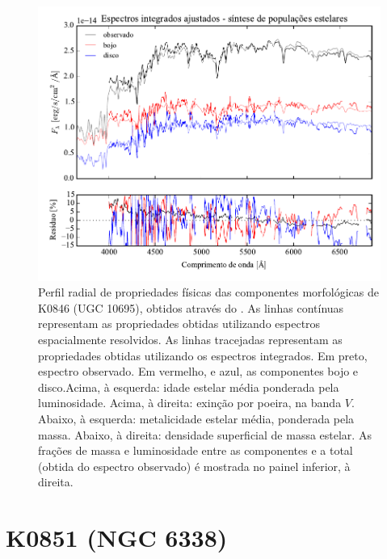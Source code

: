 \begin{figure}
	\includegraphics[page=12]{figuras/sample006a_synthesis}
	\caption[Propriedades físicas das componentes morfológicas de K0846 (UGC 10695)]
	{Perfil radial de propriedades físicas das componentes morfológicas de
	K0846 (UGC 10695), obtidos através do \starlight. As linhas contínuas
	representam as propriedades obtidas utilizando espectros espacialmente
	resolvidos. As linhas tracejadas representam as propriedades obtidas utilizando
	os espectros integrados. Em preto, espectro observado. Em vermelho, e azul, as
	componentes bojo e disco.Acima, à esquerda: idade estelar média ponderada pela
	luminosidade. Acima, à direita: exinção por poeira, na banda $V$. Abaixo, à
	esquerda: metalicidade estelar média, ponderada pela massa. Abaixo, à direita:
	densidade superficial de massa estelar. As frações de massa e luminosidade
	entre as componentes e a total (obtida do espectro observado) é mostrada no
	painel inferior, à direita.}
	\label{fig:decompSinteseRadprof:K0846}
\end{figure}


\section{K0851 (NGC 6338)}
\label{apendice:Decomp:K0851}

